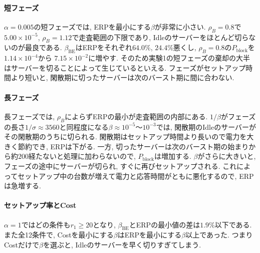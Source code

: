 \documentclass[a4paper, 11pt, dvipdfmx]{jsreport}
\begin{document}
\paragraph{短フェーズ}
$\alpha = 0.005$の短フェーズでは, ERPを最小にする$\beta$が非常に小さい. $\rho_B = 0.8$で
$5.00 \times 10^{-5}$, $\rho_B = 1.12$で走査範囲の下限であり,
Idleのサーバーをほとんど切らないのが最良である. $\beta_{\mathrm{BE}}$はERPをそれぞれ$64.0\%$,
$24.4\%$悪くし, $\rho_B = 0.8$の$P_{\mathrm{block}}$を$1.14 \times 10^{-4}$から
$7.15 \times 10^{-2}$に増やす. そのため実験1の短フェーズの棄却の大半はサーバーを切ることによって生じているといえる.
フェーズがセットアップ時間より短いと, 閑散期に切ったサーバーは次のバースト期に間に合わない.

\paragraph{長フェーズ}
長フェーズでは, $\rho_B$によらずERPの最小が走査範囲の内部にある. 
$1/\beta$がフェーズの長さ$1/\sigma \approx 3560$と同程度になる$\beta \approx 10^{-5}$〜$10^{-3}$では,
閑散期のIdleのサーバーがその閑散期のうちに切られる. 閑散期はセットアップ時間より長いので電力を大きく節約でき, ERPは下がる.
一方, 切ったサーバーは次のバースト期の始まりから約$200$経たないと処理に加わらないので, $P_{\mathrm{block}}$は増加する.
$\beta$がさらに大きいと, フェーズの途中にサーバーが切られ, すぐに再びセットアップされる.
これによってセットアップ中の台数が増えて電力と応答時間がともに悪化するので, ERPは急増する.


\paragraph{セットアップ率とCost}
$\alpha = 1$ではどの条件も$r_1 \ge 20$となり, $\beta_{\mathrm{BE}}$とERPの最小値の差は$1.9\%$以下である.
また全12条件で, Costを最小にする$\beta$はERPを最小にする$\beta$以上であった.
つまりCostだけで$\beta$を選ぶと, Idleのサーバーを早く切りすぎてしまう.
\end{document}
